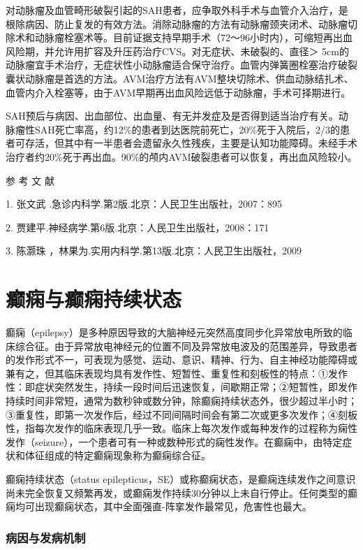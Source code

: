 对动脉瘤及血管畸形破裂引起的SAH患者，应争取外科手术与血管介入治疗，是根除病因、防止复发的有效方法。消除动脉瘤的方法有动脉瘤颈夹闭术、动脉瘤切除术和动脉瘤栓塞术等。目前证据支持早期手术（72～96小时内），可缩短再出血风险期，并允许用扩容及升压药治疗CVS。对无症状、未破裂的、直径＞
5cm的动脉瘤宜手术治疗，无症状性小动脉瘤适合保守治疗。血管内弹簧圈栓塞治疗破裂囊状动脉瘤是首选的方法。AVM治疗方法有AVM整块切除术、供血动脉结扎术、血管内介入栓塞等，由于AVM早期再出血风险远低于动脉瘤，手术可择期进行。

SAH预后与病因、出血部位、出血量、有无并发症及是否得到适当治疗有关。动脉瘤性SAH死亡率高，约12\%的患者到达医院前死亡，20\%死于入院后，2/3的患者可存活，但其中有一半患者会遗留永久性残疾，主要是认知功能障碍。未经手术治疗者约20\%死于再出血。90\%的颅内AVM破裂患者可以恢复，再出血风险较小。

\hypertarget{text00244.htmlux5cux23CHP8-1-4-4}{}
参 考 文 献

1. 张文武 .急诊内科学.第2版.北京：人民卫生出版社，2007：895

2. 贾建平.神经病学.第6版.北京：人民卫生出版社，2008：171

3. 陈灏珠 ，林果为.实用内科学.第13版.北京：人民卫生出版社，2009

\protect\hypertarget{text00245.html}{}{}

\chapter{癫痫与癫痫持续状态}

癫痫（epilepsy）是多种原因导致的大脑神经元突然高度同步化异常放电所致的临床综合征。由于异常放电神经元的位置不同及异常放电波及的范围差异，导致患者的发作形式不一，可表现为感觉、运动、意识、精神、行为、自主神经功能障碍或兼有之，但其临床表现均具有发作性、短暂性、重复性和刻板性的特点：①发作性：即症状突然发生，持续一段时间后迅速恢复，间歇期正常；②短暂性，即发作持续时间非常短，通常为数秒钟或数分钟，除癫痫持续状态外，很少超过半小时；③重复性，即第一次发作后，经过不同间隔时间会有第二次或更多次发作；④刻板性，指每次发作的临床表现几乎一致。临床上每次发作或每种发作的过程称为痫性发作（seizure），一个患者可有一种或数种形式的痫性发作。在癫痫中，由特定症状和体征组成的特定癫痫现象称为癫痫综合征。

癫痫持续状态（status
epilepticus，SE）或称癫痫状态，是癫痫连续发作之间意识尚未完全恢复又频繁再发，或癫痫发作持续30分钟以上未自行停止。任何类型的癫痫均可出现癫痫状态，其中全面强直-阵挛发作最常见，危害性也最大。

\subsection{病因与发病机制}

